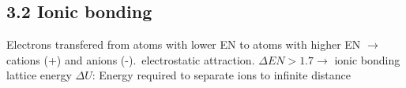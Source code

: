 \subsection{3.2 Ionic bonding}
    Electrons transfered from atoms with lower EN to atoms with higher EN $\rightarrow$ cations (+) and anions (-).\ electrostatic attraction. $\Delta EN > 1.7 \rightarrow$ ionic bonding\\
    lattice energy $\Delta U$: Energy required to separate ions to infinite distance
